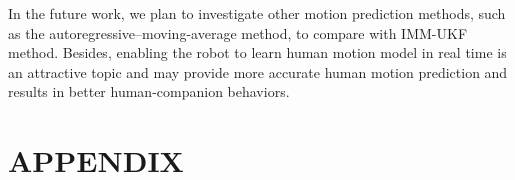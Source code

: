 \documentclass[letterpaper, 10 pt, conference]{ieeeconf}
\begin{document}
	In the future work, we plan to investigate other motion prediction methods, such as the autoregressive–moving-average method, to compare with IMM-UKF method.
	Besides,  enabling the robot to learn human motion model in real time is an attractive topic and may provide more accurate human motion prediction and results in better human-companion behaviors.
	
	
	
	
	
	
	
	
	
	\section{APPENDIX}
	
\end{document}
